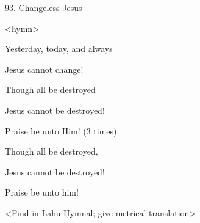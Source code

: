 
93. Changeless Jesus

<hymn>

Yesterday, today, and always

Jesus cannot change!

Though all be destroyed

Jesus cannot be destroyed!

Praise be unto Him! (3 times)

Though all be destroyed,

Jesus cannot be destroyed!

Praise be unto him!

<Find in Lahu Hymnal; give metrical translation>


